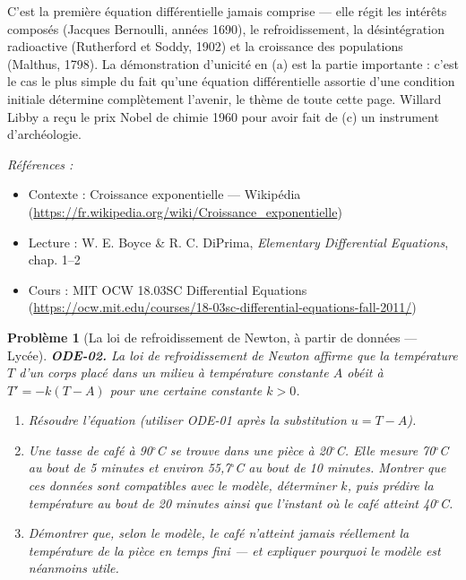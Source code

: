 \documentclass[11pt]{article}
\newtheorem{problem}{Problème}
\newenvironment{refs}{\par\small\noindent\emph{Références :}\begin{itemize}\setlength\itemsep{0pt}}{\end{itemize}\normalsize}
\begin{document}
\noindent C'est la première équation différentielle jamais comprise --- elle régit les
intérêts composés (Jacques Bernoulli, années 1690), le refroidissement, la désintégration
radioactive (Rutherford et Soddy, 1902) et la croissance des populations (Malthus, 1798). La
démonstration d'unicité en (a) est la partie importante : c'est le cas le plus simple du fait
qu'une équation différentielle assortie d'une condition initiale détermine complètement l'avenir,
le thème de toute cette page. Willard Libby a reçu le prix Nobel de chimie 1960 pour avoir fait
de (c) un instrument d'archéologie.

\begin{refs}
\item Contexte : Croissance exponentielle --- Wikipédia (\url{https://fr.wikipedia.org/wiki/Croissance_exponentielle})
\item Lecture : W. E. Boyce \& R. C. DiPrima, \textit{Elementary Differential Equations}, chap. 1--2
\item Cours : MIT OCW 18.03SC Differential Equations (\url{https://ocw.mit.edu/courses/18-03sc-differential-equations-fall-2011/})
\end{refs}

\bigskip

\begin{problem}[{La loi de refroidissement de Newton, à partir de données --- Lycée}]
\textbf{ODE-02.} La loi de refroidissement de Newton affirme que la température $ T $ d'un
corps placé dans un milieu à température constante $ A $ obéit à $ T' = -k (T - A) $ pour une
certaine constante $ k >0 $.
\begin{enumerate}
\item[(a)] Résoudre l'équation (utiliser ODE-01 après la substitution $ u = T - A $).
\item[(b)] Une tasse de café à 90$^\circ$C se trouve dans une pièce à 20$^\circ$C. Elle mesure 70$^\circ$C au
bout de 5 minutes et environ 55,7$^\circ$C au bout de 10 minutes. Montrer que ces données sont
compatibles avec le modèle, déterminer $ k $, puis prédire la température au bout de 20 minutes
ainsi que l'instant où le café atteint 40$^\circ$C.
\item[(c)] Démontrer que, selon le modèle, le café n'atteint jamais réellement la température de la
pièce en temps fini --- et expliquer pourquoi le modèle est néanmoins utile.
\end{enumerate}

\end{problem}
\end{document}
